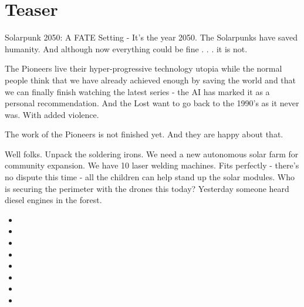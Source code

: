 \section{Teaser}

Solarpunk 2050: A FATE Setting - It's the year 2050. The Solarpunks have saved humanity. And although now everything could be fine . . . it is not.

The Pioneers live their hyper-progressive technology utopia while the normal people think that we have already achieved enough by saving the world and that we can finally finish watching the latest series - the AI has marked it as a personal recommendation. And the Lost want to go back to the 1990's as it never was. With added violence.

The work of the Pioneers is not finished yet. And they are happy about that.

\begin{pioneertalk}[title=Pioneer Photovoltaik site]
    Well folks. Unpack the soldering irons. We need a new autonomous solar farm for community expansion.
    We have 10 laser welding machines. Fits perfectly - there's no dispute this time - all the children can help stand up the solar modules. Who is securing the perimeter with the drones this today? Yesterday someone heard diesel engines in the forest.
\end{pioneertalk}

\begin{pioneertalk}[title=Pioneer Photovoltaik site - later]
    \begin{itemize}
        \item {}
        \item {}
        \item {}
        \item {}
        \item {}
        \item {}
        \item {}
        \item {}
    \end{itemize}
\end{pioneertalk}

